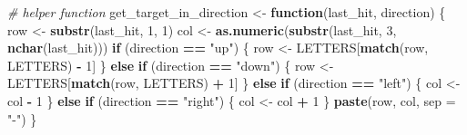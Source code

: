 \documentclass[
]{article}
\newenvironment{Shaded}{\begin{snugshade}}{\end{snugshade}}
\newcommand{\AttributeTok}[1]{\textcolor[rgb]{0.13,0.29,0.53}{#1}}
\newcommand{\CommentTok}[1]{\textcolor[rgb]{0.56,0.35,0.01}{\textit{#1}}}
\newcommand{\ControlFlowTok}[1]{\textcolor[rgb]{0.13,0.29,0.53}{\textbf{#1}}}
\newcommand{\DecValTok}[1]{\textcolor[rgb]{0.00,0.00,0.81}{#1}}
\newcommand{\FunctionTok}[1]{\textcolor[rgb]{0.13,0.29,0.53}{\textbf{#1}}}
\newcommand{\NormalTok}[1]{#1}
\newcommand{\OtherTok}[1]{\textcolor[rgb]{0.56,0.35,0.01}{#1}}
\newcommand{\SpecialCharTok}[1]{\textcolor[rgb]{0.81,0.36,0.00}{\textbf{#1}}}
\newcommand{\StringTok}[1]{\textcolor[rgb]{0.31,0.60,0.02}{#1}}
\begin{document}
\begin{Shaded}
\begin{Highlighting}[]
  \CommentTok{\# helper function}
\NormalTok{  get\_target\_in\_direction }\OtherTok{\textless{}{-}} \ControlFlowTok{function}\NormalTok{(last\_hit, direction) \{}
\NormalTok{    row }\OtherTok{\textless{}{-}} \FunctionTok{substr}\NormalTok{(last\_hit, }\DecValTok{1}\NormalTok{, }\DecValTok{1}\NormalTok{)}
\NormalTok{    col }\OtherTok{\textless{}{-}} \FunctionTok{as.numeric}\NormalTok{(}\FunctionTok{substr}\NormalTok{(last\_hit, }\DecValTok{3}\NormalTok{, }\FunctionTok{nchar}\NormalTok{(last\_hit)))}
    \ControlFlowTok{if}\NormalTok{ (direction }\SpecialCharTok{==} \StringTok{"up"}\NormalTok{) \{}
\NormalTok{      row }\OtherTok{\textless{}{-}}\NormalTok{ LETTERS[}\FunctionTok{match}\NormalTok{(row, LETTERS) }\SpecialCharTok{{-}} \DecValTok{1}\NormalTok{]}
\NormalTok{    \} }\ControlFlowTok{else} \ControlFlowTok{if}\NormalTok{ (direction }\SpecialCharTok{==} \StringTok{"down"}\NormalTok{) \{}
\NormalTok{      row }\OtherTok{\textless{}{-}}\NormalTok{ LETTERS[}\FunctionTok{match}\NormalTok{(row, LETTERS) }\SpecialCharTok{+} \DecValTok{1}\NormalTok{]}
\NormalTok{    \} }\ControlFlowTok{else} \ControlFlowTok{if}\NormalTok{ (direction }\SpecialCharTok{==} \StringTok{"left"}\NormalTok{) \{}
\NormalTok{      col }\OtherTok{\textless{}{-}}\NormalTok{ col }\SpecialCharTok{{-}} \DecValTok{1}
\NormalTok{    \} }\ControlFlowTok{else} \ControlFlowTok{if}\NormalTok{ (direction }\SpecialCharTok{==} \StringTok{"right"}\NormalTok{) \{}
\NormalTok{      col }\OtherTok{\textless{}{-}}\NormalTok{ col }\SpecialCharTok{+} \DecValTok{1}
\NormalTok{    \}}
    \FunctionTok{paste}\NormalTok{(row, col, }\AttributeTok{sep =} \StringTok{"{-}"}\NormalTok{)}
\NormalTok{  \}}
  

\end{Highlighting}
\end{Shaded}
\end{document}
